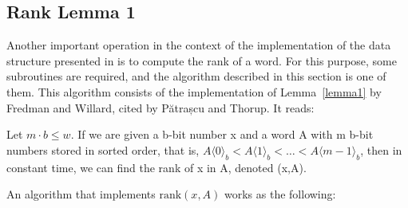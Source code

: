 \subsection{Rank Lemma 1} \label{sec:rankLemma1}

Another important operation in the context of the implementation of the data structure presented in \cite{patrascu2014dynamic} is to compute the rank of a word. For this purpose, some subroutines are required, and the algorithm described in this section is one of them. This algorithm consists of the implementation of Lemma~\ref{lemma1} by Fredman and Willard, cited by Pătrașcu and Thorup. It reads:
\begin{lemma} \label{lemma1}
Let $m \cdot b \leq w$. If we are given a b-bit number x and a word A with m b-bit numbers stored in sorted order, that is, $A\langle 0 \rangle_b < A\langle 1 \rangle_b < \dots < A\langle m - 1 \rangle_b$, then in constant time, we can find the rank of x in A, denoted (x,A).
\end{lemma}
An algorithm that implements $\text{rank}(x,A)$ works as the following:
